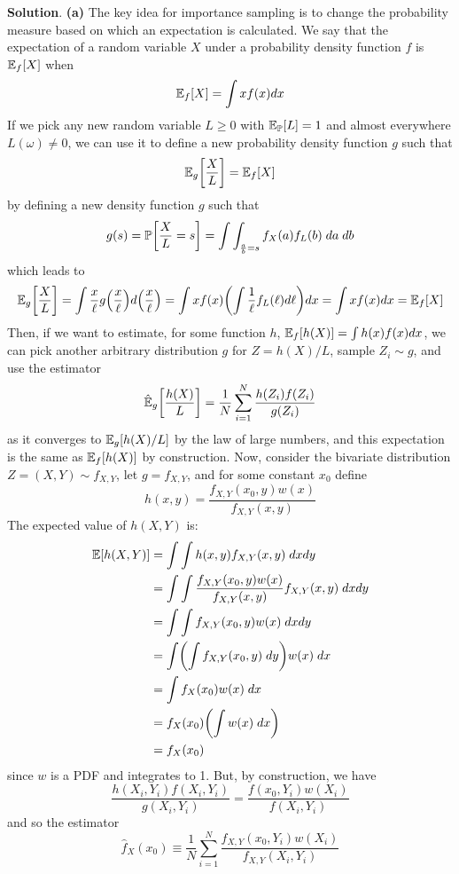 \textbf{Solution}.
\textbf{(a)}
The key idea for importance sampling is to change the probability
measure based on which an expectation is calculated. We say that the
expectation of a random variable \(X\) under a probability density
function \(f\) is \(\operatorname{\mathbb{E}}_f[X]\) when
\[
\operatorname{\mathbb{E}}_f[X] = \int x f(x) dx
\]
If we pick any new random variable \(L \geq 0\) with
\(\operatorname{\mathbb{E}}_{\operatorname{\mathbb{P}}}[L] = 1\) and almost everywhere
\(L(\omega) \neq 0\), we can use it to define a new probability density
function \(g\) such that
\[
\EXP_g\left[\frac{X}{L}\right] = \EXP_f[X]
\]
by defining a new density function \(g\) such that
\[
g\left(s\right) = \PROB\left[\frac{X}{L} = s\right] = \int \int_{\frac{a}{b} = s} f_X(a) f_L(b) \; da\; db 
\]
which leads to
\[
\EXP_g\left[\frac{X}{L}\right] = \int \frac{x}{\ell} g\left(\frac{x}{\ell}\right) d \left( \frac{x}{\ell} \right) = \int x f(x) \left( \int \frac{1}{\ell} f_L(\ell) d\ell \right) dx  = \int x f(x) dx  = \EXP_f[X]
\]
Then, if we want to estimate, for some function \(h\),
\(\operatorname{\mathbb{E}}_f[h(X)] = \int h(x) f(x) dx\), we can pick another
arbitrary distribution \(g\) for \(Z = h(X) / L\), sample
\(Z_{i} \sim g\), and use the estimator
\[
\hat{\EXP}_g\left[\frac{h(X)}{L}\right] = \frac{1}{N} \sum_{i=1}^N \frac{h(Z_{i}) f(Z_{i})}{g(Z_{i})}
\]
as it converges to \(\EXP_g\left[h(X) / L\right]\) by the law of
large numbers, and this expectation is the same as
\(\operatorname{\mathbb{E}}_f[h(X)]\) by construction.
Now, consider the bivariate distribution \(Z = (X, Y) \sim f_{X, Y}\),
let \(g = f_{X, Y}\), and for some constant \(x_{0}\) define
\[
h(x, y) = \frac{f_{X, Y}(x_{0}, y) w(x) }{ f_{X, Y}(x, y) }
\]
The expected value of \(h(X, Y)\) is:
\begin{align*}
\EXP[h(X, Y)] &= \int \int h(x, y) f_{X, Y}(x, y) \; dx dy \\
&= \int \int \frac{f_{X, Y}(x_{0}, y) w(x)}{f_{X, Y}(x, y)} f_{X, Y}(x, y) \; dx dy \\
&= \int \int f_{X, Y}(x_{0}, y) w(x) \; dx dy \\
&= \int \left(\int f_{X, Y}(x_{0}, y) \; dy \right) w(x) \; dx \\
&= \int f_X(x_{0}) w(x) \; dx \\
&= f_X(x_{0}) \left( \int w(x) \; dx \right) \\
&= f_X(x_{0})
\end{align*}
since \(w\) is a PDF and integrates to 1. But, by construction, we have
\[
\frac{h(X_{i}, Y_{i}) f(X_{i}, Y_{i})}{g(X_{i}, Y_{i})}
=
\frac{f(x_{0}, Y_{i}) w(X_{i})}{f(X_{i}, Y_{i})}
\]
and so the estimator
\[
\hat{f}_X(x_{0}) \equiv \frac{1}{N} \sum_{i=1}^N \frac{f_{X, Y}(x_{0}, Y_{i})  w(X_{i})}{f_{X, Y}(X_{i}, Y_{i})}
\]
